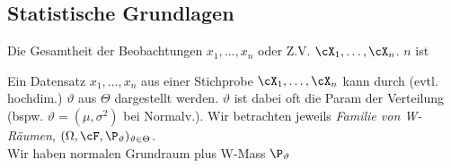 \subsection{Statistische Grundlagen}
\shortterm {} Die Gesamtheit der Beobachtungen $x_1, \ldots, x_n$ oder Z.V. $\cX_1, \ldots, \cX_n$. $n$ ist 

\shortdefinition[Parameterraum] Ein Datensatz $x_1, \ldots, x_n$ aus einer Stichprobe $\cX_1, \ldots, \cX_n$ kann durch (evtl. hochdim.)
 $\vartheta$ aus  $\Theta$ dargestellt werden. $\vartheta$ ist dabei oft die Param der Verteilung (bspw. $\vartheta = (\mu, \sigma^2)$ bei Normalv.).
Wir betrachten jeweils \textit{Familie von W-Räumen}, $(\Omega, \cF, \P_\vartheta)_{\vartheta \in \Theta}$.\\
{\scriptsize Wir haben normalen Grundraum plus W-Mass $\P_\vartheta$}
